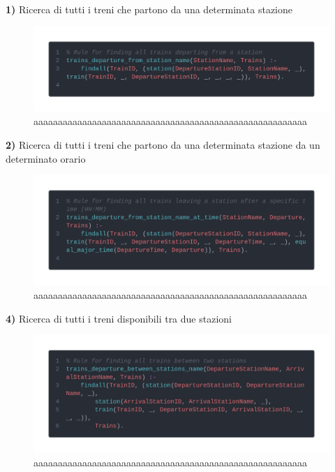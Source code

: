 \documentclass[italian,12pt,a4paper]{article}
\begin{document}
	\textbf{1)} Ricerca di tutti i treni che partono da una determinata stazione
	\begin{figure}[!h]
		\centering
		\includegraphics[width=1.1\linewidth]{img/code1}
		\caption{aaaaaaaaaaaaaaaaaaaaaaaaaaaaaaaaaaaaaaaaaaaaaaaaaaaaaaaa}
	\end{figure}

	\textbf{2)} Ricerca di tutti i treni che partono da una determinata stazione da un determinato orario
	\begin{figure}[!h]
		\centering
		\includegraphics[width=1.1\linewidth]{img/code2}
		\caption{aaaaaaaaaaaaaaaaaaaaaaaaaaaaaaaaaaaaaaaaaaaaaaaaaaaaaaaa}
	\end{figure}

	\textbf{4)} Ricerca di tutti i treni disponibili tra due stazioni
	\begin{figure}[!h]
		\centering
		\includegraphics[width=1.1\linewidth]{img/code3}
		\caption{aaaaaaaaaaaaaaaaaaaaaaaaaaaaaaaaaaaaaaaaaaaaaaaaaaaaaaaa}
	\end{figure}	
	
\end{document}
